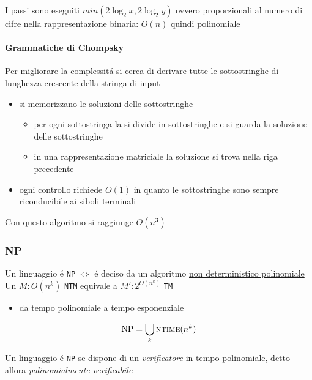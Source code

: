 \documentclass[
                        12pt, %
                        a4paper, %
                        oneside, %
                        headinclude,footinclude, %
                        BCOR5mm, %
                  ]{scrartcl}
\begin{document}
I passi sono eseguiti \(min(2 \log_{2} x, 2\log_{2} y)\) ovvero proporzionali al numero di cifre nella rappresentazione binaria: \(O(n)\) quindi \uline{polinomiale}

\paragraph{Grammatiche di Chompsky}
\label{sec:org68dd727}
Per migliorare la complessitá si cerca di derivare tutte le sottostringhe di lunghezza crescente della stringa di input
\begin{itemize}
\item si memorizzano le soluzioni delle sottostringhe
\begin{itemize}
\item per ogni sottostringa la si divide in sottostringhe e si guarda la soluzione delle sottostringhe
\item in una rappresentazione matriciale la soluzione si trova nella riga precedente
\end{itemize}
\item ogni controllo richiede \(O(1)\) in quanto le sottostringhe sono sempre riconducibile ai siboli terminali
\end{itemize}
Con questo algoritmo si raggiunge \(O(n^3)\)

\subsubsection{NP}
\label{sec:org244e6b6}
Un linguaggio é \texttt{NP} \(\iff\) é deciso da un algoritmo \uline{non deterministico polinomiale}
Un \(M: O(n^k)\) \texttt{NTM} equivale a \(M': 2^{O(n^k)}\) \texttt{TM}
\begin{itemize}
\item da tempo polinomiale a tempo esponenziale
\end{itemize}

\[\text{NP} = \bigcup_k \textsc{ntime}(n^k)\]

Un linguaggio é \texttt{NP} se dispone di un \emph{verificatore} in tempo polinomiale, detto allora \emph{polinomialmente verificabile}
\end{document}
